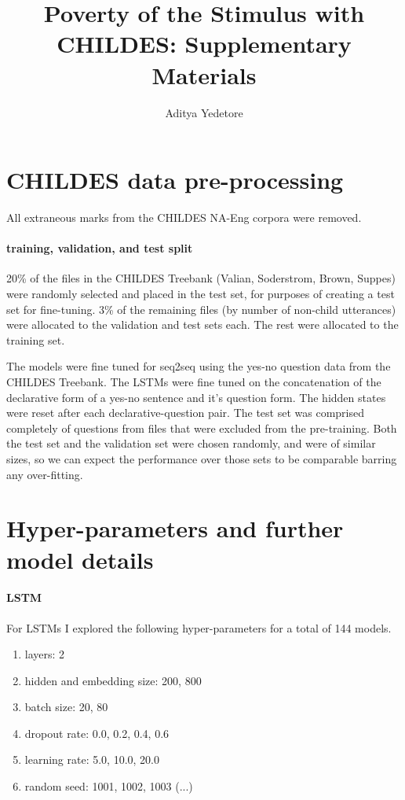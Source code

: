 \documentclass{article}
\title{Poverty of the Stimulus with CHILDES: Supplementary Materials}
\author{Aditya Yedetore}
\date{}
\begin{document}
\maketitle

\section*{CHILDES data pre-processing}
All extraneous marks from the CHILDES NA-Eng corpora were removed. 

\paragraph{training, validation, and test split}
20\% of the files in the CHILDES Treebank (Valian, Soderstrom, Brown, Suppes) were randomly selected and placed in the test set, for purposes of creating a test set for fine-tuning. 3\% of the remaining files (by number of non-child utterances) were allocated to the validation and test sets each. The rest were allocated to the training set. 

The models were fine tuned for seq2seq using the yes-no question data from the CHILDES Treebank. The LSTMs were fine tuned on the concatenation of the declarative form of a yes-no sentence and it's question form. The hidden states were reset after each declarative-question pair.  The test set was comprised completely of questions from files that were excluded from the pre-training. Both the test set and the validation set were chosen randomly, and were of similar sizes, so we can expect the performance over those sets to be comparable barring any over-fitting. 

\section*{Hyper-parameters and further model details}
\paragraph{LSTM} For LSTMs I explored the following hyper-parameters for a total of 144 models. 

\begin{enumerate}
    \item layers: 2
    \item hidden and embedding size: 200, 800
    \item batch size: 20, 80 
    \item dropout rate: 0.0, 0.2, 0.4, 0.6 
    \item learning rate: 5.0, 10.0, 20.0
    \item random seed: 1001, 1002, 1003 (...)
\end{enumerate}
\end{document}
